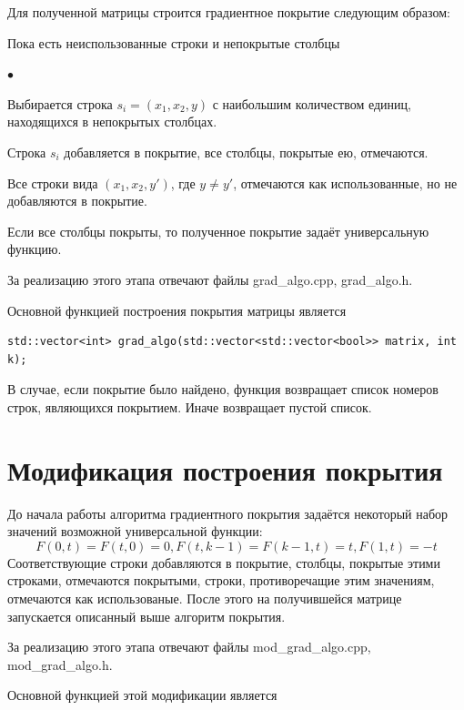\documentclass[oneside,final,14pt]{extreport}
\newenvironment{compactlist}{
    \begin{list}{{$\bullet$}}{
      \setlength\partopsep{0pt}
      \setlength\parskip{0pt}
      \setlength\parsep{0pt}
      \setlength\topsep{0pt}
      \setlength\itemsep{0pt}
} }{

 \end{list} 
}
\begin{document}
Для полученной матрицы строится градиентное покрытие следующим образом:
\begin{enumerate}
\item Пока есть неиспользованные строки и непокрытые столбцы
\begin{compactlist}
\item Выбирается строка \(s_i = (x_1, x_2, y)\) с наибольшим количеством единиц, находящихся в непокрытых столбцах.
\item Строка \(s_i\) добавляется в покрытие, все столбцы, покрытые ею, отмечаются.
\item Все строки вида \((x_1, x_2, y')\), где \(y \neq y'\), отмечаются как использованные, но не добавляются в покрытие.
\end{compactlist}
\item Если все столбцы покрыты, то полученное покрытие задаёт универсальную функцию.
\end{enumerate}

За реализацию этого этапа отвечают файлы \dq grad\_algo.cpp\dq, \dq grad\_algo.h\dq.

Основной функцией построения покрытия матрицы является

\begin{lstlisting}
std::vector<int> grad_algo(std::vector<std::vector<bool>> matrix, int k);
\end{lstlisting}

В случае, если покрытие было найдено, функция возвращает список номеров строк, являющихся покрытием. 
Иначе возвращает пустой список.

\section*{Модификация построения покрытия}

До начала работы алгоритма градиентного покрытия задаётся некоторый набор значений возможной универсальной функции: 
\[F(0, t) = F(t, 0) = 0, F(t, k-1) = F(k-1, t) = t, F(1, t) = -t\]
Соответствующие строки добавляются в покрытие, столбцы, покрытые этими строками, отмечаются покрытыми, 
строки, противоречащие этим значениям, отмечаются как использованые.
После этого на получившейся матрице запускается описанный выше алгоритм покрытия.

За реализацию этого этапа отвечают файлы \dq mod\_grad\_algo.cpp\dq, \dq mod\_grad\_algo.h\dq.

Основной функцией этой модификации является
\end{document}
